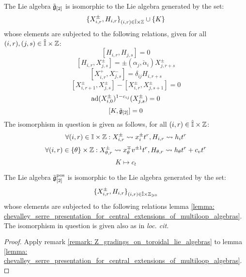         \begin{lemma} \label{lemma: chevalley_serre_presentation_for_central_extensions_of_multiloop_algebras}
            The Lie algebra $\tilde{\mathfrak{g}}_{[2]}$ is isomorphic to the Lie algebra generated by the set:
                $$\{ X_{i, r}^{\pm}, H_{i, r} \}_{(i, r) \in \hat{\simpleroots} \x \Z} \cup \{ K \}$$
            whose elements are subjected to the following relations, given for all $(i, r), (j, s) \in \hat{\simpleroots} \x \Z$:
                $$[ H_{i, r}, H_{j, s} ] = 0$$
                $$[ H_{i, r}, X_{j, s}^{\pm} ] = \pm (\alpha_j, \check{\alpha}_i) X_{j, r + s}^{\pm}$$
                $$[ X_{i, r}^+, X_{j, s}^- ] = \delta_{ij} H_{i, r + s}$$
                $$[ X_{i, r + 1}^{\pm}, X_{j, s}^{\pm} ] - [ X_{i, r}^{\pm}, X_{j, s + 1}^{\pm} ] = 0$$
                $$\mathrm{ad}(X_{i, 0}^{\pm})^{1 - c_{ij}}( X_{j, s}^{\pm} ) = 0$$
                $$[K, \tilde{\mathfrak{g}}_{[2]}] = 0$$
            The isomorphism in question is given as follows, for all $(i, r) \in \hat{\simpleroots} \x \Z$:
                $$\forall (i, r) \in \simpleroots \x \Z: X_{i, r}^{\pm} \mapsto x_i^{\pm} t^r, H_{i, r} \mapsto h_i t^r$$
                $$\forall (i, r) \in \{\theta\} \x \Z: X_{\theta, r}^{\pm} \mapsto x_{\theta}^{\mp} v^{\pm 1} t^r, H_{\theta, r} \mapsto h_{\theta} t^r + c_v t^r$$
                $$K \mapsto c_t$$
        \end{lemma}
        \begin{corollary}
            The Lie algebra $\tilde{\mathfrak{g}}_{[2]}^{\mathrm{pos}}$ is isomorphic to the Lie algebra generated by the set:
                $$\{ X_{i, r}^{\pm}, H_{i, r} \}_{(i, r) \in \hat{\simpleroots} \x \Z_{\geq 0}}$$
            whose elements are subjected to the following relations lemma \ref{lemma: chevalley_serre_presentation_for_central_extensions_of_multiloop_algebras}. The isomorphism in question is given also as in \textit{loc. cit.}
        \end{corollary}
            \begin{proof}
                Apply remark \ref{remark: Z_gradings_on_toroidal_lie_algebras} to lemma \ref{lemma: chevalley_serre_presentation_for_central_extensions_of_multiloop_algebras}.
            \end{proof}